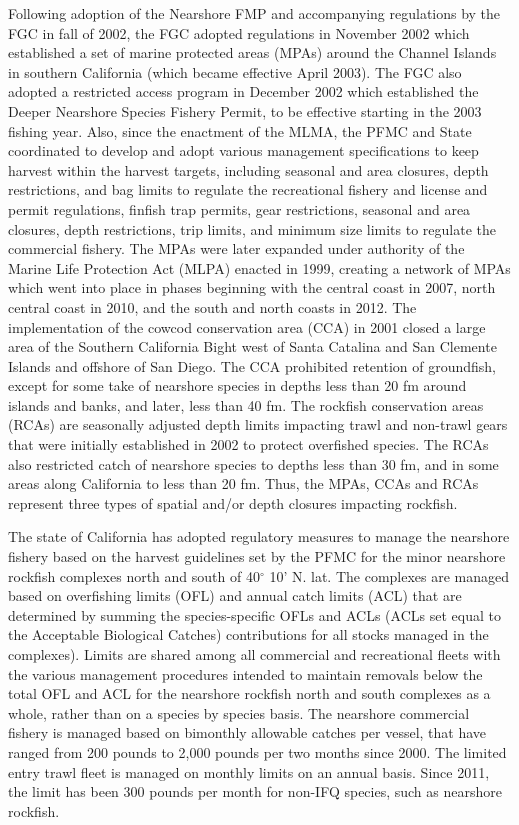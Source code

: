 \documentclass[11pt,
  english,
  letterpaper,
]{article}
\begin{document}
Following adoption of the Nearshore FMP and accompanying regulations by the FGC in fall of 2002, the FGC adopted regulations in November 2002 which established a set of marine protected areas (MPAs) around the Channel Islands in southern California (which became effective April 2003). The FGC also adopted a restricted access program in December 2002 which established the Deeper Nearshore Species Fishery Permit, to be effective starting in the 2003 fishing year. Also, since the enactment of the MLMA, the PFMC and State coordinated to develop and adopt various management specifications to keep harvest within the harvest targets, including seasonal and area closures, depth restrictions, and bag limits to regulate the recreational fishery and license and permit regulations, finfish trap permits, gear restrictions, seasonal and area closures, depth restrictions, trip limits, and minimum size limits to regulate the commercial fishery. The MPAs were later expanded under authority of the Marine Life Protection Act (MLPA) enacted in 1999, creating a network of MPAs which went into place in phases beginning with the central coast in 2007, north central coast in 2010, and the south and north coasts in 2012. The implementation of the cowcod conservation area (CCA) in 2001 closed a large area of the Southern California Bight west of Santa Catalina and San Clemente Islands and offshore of San Diego. The CCA prohibited retention of groundfish, except for some take of nearshore species in depths less than 20 fm around islands and banks, and later, less than 40 fm. The rockfish conservation areas (RCAs) are seasonally adjusted depth limits impacting trawl and non-trawl gears that were initially established in 2002 to protect overfished species. The RCAs also restricted catch of nearshore species to depths less than 30 fm, and in some areas along California to less than 20 fm. Thus, the MPAs, CCAs and RCAs represent three types of spatial and/or depth closures impacting rockfish.

The state of California has adopted regulatory measures to manage the nearshore fishery based on the harvest guidelines set by the PFMC for the minor nearshore rockfish complexes north and south of 40\(^\circ\) 10' N. lat. The complexes are managed based on overfishing limits (OFL) and annual catch limits (ACL) that are determined by summing the species-specific OFLs and ACLs (ACLs set equal to the Acceptable Biological Catches) contributions for all stocks managed in the complexes). Limits are shared among all commercial and recreational fleets with the various management procedures intended to maintain removals below the total OFL and ACL for the nearshore rockfish north and south complexes as a whole, rather than on a species by species basis. The nearshore commercial fishery is managed based on bimonthly allowable catches per vessel, that have ranged from 200 pounds to 2,000 pounds per two months since 2000. The limited entry trawl fleet is managed on monthly limits on an annual basis. Since 2011, the limit has been 300 pounds per month for non-IFQ species, such as nearshore rockfish.
\end{document}
